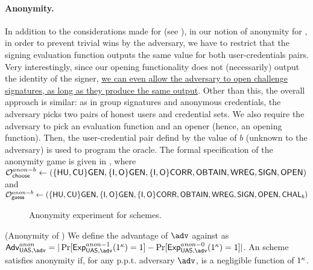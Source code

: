 \paragraph{Anonymity.} %
In addition to the considerations made for \GSAC (see ),
in our notion of anonymity for \UAS,
in order to prevent trivial wins by the adversary, we have to restrict that the
signing evaluation function outputs the same value for both user-credentials
pairs. Very interestingly, since our opening functionality does not
(necessarily) output the identity of the signer, \uline{we can even allow the
  adversary to open challenge signatures, as long as they produce the same
  output}. Other than this, the overall approach is similar: as
in group signatures and anonymous credentials, the adversary picks two pairs of
honest users and credential sets. We also require the adversary to pick an
evaluation function and an opener (hence, an opening function). Then, the
user-credential pair defind by the value of $b$ (unknown to the adversary) is
used to program the \CHALb oracle. The formal specification of the anonymity
game is given in , where $\mathcal{O}^{anon-b}_{\mathsf{choose}} \gets (\lbrace\mathsf{HU},
\mathsf{CU}\rbrace\mathsf{GEN},\lbrace\mathsf{I},\mathsf{O}\rbrace\mathsf{GEN},\lbrace\mathsf{I},\mathsf{O}\rbrace\mathsf{CORR},\mathsf{OBTAIN},
\mathsf{WREG},\mathsf{SIGN},\mathsf{OPEN})$ and $\mathcal{O}^{anon-b}_{\mathsf{guess}} \gets (\lbrace\mathsf{HU},\mathsf{CU}\rbrace\mathsf{GEN},\lbrace\mathsf{I},
\mathsf{O}\rbrace\mathsf{GEN},\lbrace\mathsf{I},\mathsf{O}\rbrace\mathsf{CORR},\mathsf{OBTAIN},\mathsf{WREG},\mathsf{SIGN},\mathsf{OPEN},\mathsf{CHAL}_b)$

\begin{figure}[htp!]
  \caption{Anonymity experiment for \UAS schemes.}
  \label{fig:exp-uas-anonb}
\end{figure}

\begin{definition}{(Anonymity of \UAS)}
  \label{def:anonymity-uas}  
  We define the advantage \AdvAnon of $\adv$ against \ExpAnonb as
  $\AdvAnon=|\Pr\lbrack\ExpAnono(1^\secpar)=1\rbrack-
  \Pr\lbrack\ExpAnonz(1^\secpar)=1\rbrack|$.
  An \UAS scheme satisfies anonymity if, for any p.p.t. adversary $\adv$,
  \AdvAnon is a negligible function of $1^\kappa$.
\end{definition}

